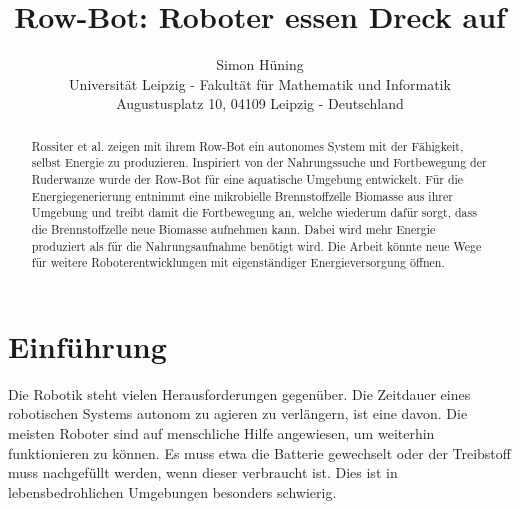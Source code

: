 \documentclass{SeminarV2}
\begin{document}
\title{Row-Bot: Roboter essen Dreck auf}

\author{Simon Hüning
%
%
\vspace{.3cm}\\
%
Universität Leipzig - Fakultät für Mathematik und Informatik \\
Augustusplatz 10, 04109 Leipzig - Deutschland
%
}

\maketitle

\begin{abstract}
Rossiter et al. zeigen mit ihrem Row-Bot ein autonomes System mit der Fähigkeit, selbst Energie zu produzieren. Inspiriert von der Nahrungssuche und Fortbewegung der Ruderwanze wurde der Row-Bot für eine aquatische Umgebung entwickelt. Für die Energiegenerierung entnimmt eine mikrobielle Brennstoffzelle Biomasse aus ihrer Umgebung und treibt damit die Fortbewegung an, welche wiederum dafür sorgt, dass die Brennstoffzelle neue Biomasse aufnehmen kann. Dabei wird mehr Energie produziert als für die Nahrungsaufnahme benötigt wird. Die Arbeit könnte neue Wege für weitere Roboterentwicklungen mit eigenständiger Energieversorgung öffnen.
\end{abstract}

\section{Einführung}
Die Robotik steht vielen Herausforderungen gegenüber. Die Zeitdauer eines robotischen Systems autonom zu agieren zu verlängern, ist eine davon. Die meisten Roboter sind auf menschliche Hilfe angewiesen, um weiterhin funktionieren zu können. Es muss etwa die Batterie gewechselt oder der Treibstoff muss nachgefüllt werden, wenn dieser verbraucht ist. Dies ist in lebensbedrohlichen Umgebungen besonders schwierig. 
\end{document}
